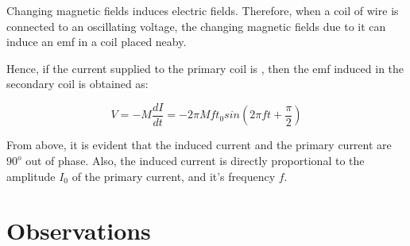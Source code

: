 \documentclass{ieeeconf}
\begin{document}
Changing magnetic fields induces electric fields. Therefore, when a coil of wire is connected to an oscillating voltage, the changing magnetic fields due to it can induce an emf in a coil placed neaby.

Hence, if the current supplied to the primary coil is ,
then the emf induced in the secondary coil is obtained as:

$$
V=-M\frac{dI}{dt}= -2\pi Mft_0 sin(2\pi f t+\frac{\pi}{2})
$$

From above, it is evident that the induced current and the primary current are $90^o$ out of phase. Also, the induced current is directly proportional to the amplitude $I_0$ of the primary current, and it's frequency $f$.

\section{Observations}
\end{document}
